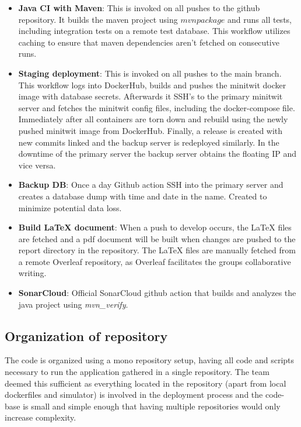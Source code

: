 \begin{itemize}
    \item \textbf{Java CI with Maven}: This is invoked on all pushes to the github repository. It builds the maven project using $mvn package$ and runs all tests, including integration tests on a remote test database. This workflow utilizes caching to ensure that maven dependencies aren't fetched on consecutive runs. 
    \item \textbf{Staging deployment}: This is invoked on all pushes to the main branch. This workflow logs into DockerHub, builds and pushes the minitwit docker image with database secrets. Afterwards it SSH's to the primary minitwit server and fetches the minitwit config files, including the docker-compose file. Immediately after all containers are torn down and rebuild using the newly pushed minitwit image from DockerHub. Finally, a release is created with new commits linked and the backup server is redeployed similarly. In the downtime of the primary server the backup server obtains the floating IP and vice versa. 
    \item \textbf{Backup DB}: Once a day Github action SSH into the primary server and creates a database dump with time and date in the name. Created to minimize potential data loss. 
    \item \textbf{Build LaTeX document}: When a push to develop occurs, the LaTeX files are fetched and a pdf document will be built when changes are pushed to the report directory in the repository. The LaTeX files are manually fetched from a remote Overleaf repository, as Overleaf facilitates the groups collaborative writing. 
    \item \textbf{SonarCloud}: Official SonarCloud github action that builds and analyzes the java project using \textit{mvn\_verify}. 
\end{itemize}


\subsection{Organization of repository}
The code is organized using a mono repository setup, having all code and scripts necessary to run the application gathered in a single repository. The team deemed this sufficient as everything located in the repository (apart from local dockerfiles and simulator) is involved in the deployment process and the code-base is small and simple enough that having multiple repositories would only increase complexity. 

